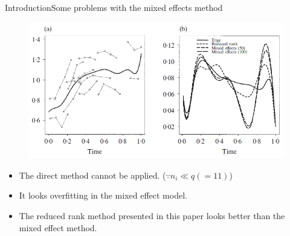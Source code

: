 \documentclass{beamer}
\begin{document}
\begin{frame}{Introduction}{Some problems with the mixed effects method}
	\begin{figure}[h] %
		\begin{center}
			\includegraphics[width=0.7\linewidth]{img/2.png}
		\end{center}
		\label{fig:long}
		\label{fig:onecol}
	\end{figure}	
	\begin{itemize}
		\item {
			The direct method cannot be applied. ($\because n_i \ll q(=11)$)
		}
		\item {
			It looks overfitting in the mixed effect model.
		}
		\item {
			The reduced rank method presented in this paper looks better than the mixed effect method.
		}
	\end{itemize}
\end{frame}
\end{document}
